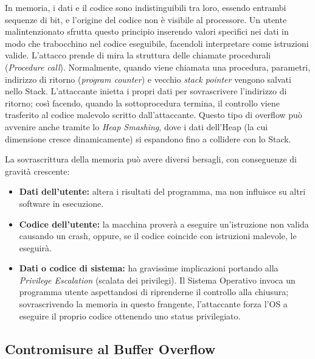 \documentclass{article}
\begin{document}
\vspace{0.3cm}
\noindent In memoria, i dati e il codice sono indistinguibili tra loro, essendo entrambi sequenze di bit, e l'origine del codice non è visibile al processore. 
Un utente malintenzionato sfrutta questo principio inserendo valori specifici nei dati in modo che trabocchino nel codice eseguibile, facendoli interpretare come istruzioni valide. 
L'attacco prende di mira la struttura delle chiamate procedurali (\textit{Procedure call}). 
Normalmente, quando viene chiamata una procedura, parametri, indirizzo di ritorno (\textit{program counter}) e vecchio \textit{stack pointer} vengono salvati nello Stack. 
L'attaccante inietta i propri dati per sovrascrivere l'indirizzo di ritorno; così facendo, quando la sottoprocedura termina, il controllo viene trasferito al codice malevolo scritto dall'attaccante. 
Questo tipo di overflow può avvenire anche tramite lo \textit{Heap Smashing}, dove i dati dell'Heap (la cui dimensione cresce dinamicamente) si espandono fino a collidere con lo Stack.

\vspace{0.3cm}
\noindent La sovrascrittura della memoria può avere diversi bersagli, con conseguenze di gravità crescente:

\begin{itemize}
    \item \textbf{Dati dell'utente:} altera i risultati del programma, ma non influisce su altri software in esecuzione.
    \item \textbf{Codice dell'utente:} la macchina proverà a eseguire un'istruzione non valida causando un crash, oppure, se il codice coincide con istruzioni malevole, le eseguirà.
    \item \textbf{Dati o codice di sistema:} ha gravissime implicazioni portando alla \textit{Privilege Escalation} (scalata dei privilegi). 
    Il Sistema Operativo invoca un programma utente aspettandosi di riprenderne il controllo alla chiusura; sovrascrivendo la memoria in questo frangente, l'attaccante forza l'OS a eseguire il proprio codice ottenendo uno status privilegiato.
\end{itemize}

\vspace{0.5cm}

\subsection*{Contromisure al Buffer Overflow}
\end{document}

